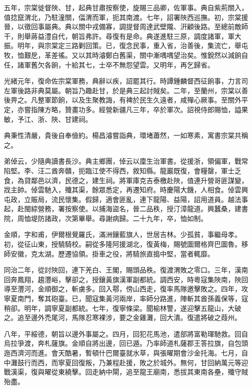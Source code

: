 \begin{pinyinscope}
五年，宗棠徙督陜、甘，起典甘肅按察使，旋賜三品卿，佐軍事。典自紫荊關入，值捻竄渭北，乃駐潼關，偪渭而軍，扼其南渡。七年，詔署陜西巡撫。初，宗棠援晉，以徵回事屬典。典以關中戎備寡，調提督周達武壁隴、汧顧後路。至總前敵師干，則舉蔣益澧自代，朝旨弗許。尋復有是命。典遂進駐三原，調度諸軍，軍大振。明年，與宗棠定三路剿回策。已，復念民事，重入省，治善後，集流亡，舉屯牧，恤艱戹，革差徭。又以其時濬鄭白舊渠，關中漸喁喁望治矣。惟銳然以減餉自任，諸軍舊欠各餉，十給其七，士卒不無怨望雲。又明年，再乞歸省。

光緒元年，復命佐宗棠軍務，典辭以疾，詔罷其行。時譚鍾麟督西征餉事，力言司左軍後路非典莫屬。朝旨乃趣赴甘，於是典三起討賊矣。二年，至蘭州，宗棠以善後畀之。凡整軍節餉，以及生聚教誨，有裨於民生久遠者，咸殫心厥事。至關外平定，亦嘗指陳方略，贊畫功多。經營新疆凡三年，卒於軍次。詔視侍郎賜恤，謚果敏，予江、浙、陜、甘建祠。

典秉性清嚴，貴後自奉儉約。楊昌濬嘗詣典，環堵蕭然，一如寒素，寓書宗棠共稱之。

弟倬云，少隨典讀書長沙。典主鄉團，倬云以廩生治軍書。從援浙，領偏軍，戰常陷堅。李、汪二酋奔贛，扼臨江使不得西，敘知縣。龍巖既復，會糧罄，軍士乏食，為貸鄰邑以濟，民德之，建生祠。將軍庫克吉泰檄赴陜，值連升營哥匪謀變，戕主帥。倬雲馳入，殲其渠，餘眾悉定，再遷知府。時慶陽大饑，人相食。倬雲興屯政，立賑局，流民懷集。假歸，適會匪亂，連下龍陽、益陽，詔用道員。越法事起，赴閩綜營務，署按察使。以捕海盜名，晉二品秩，授汀漳龍道。興蠶桑，建書院，周恤堤防諸政，次第畢舉。尋謝病歸。二十九年，卒，恤如制。

金順，字和甫，伊爾根覺羅氏，滿洲鑲藍旗人，世居吉林。少孤貧，事繼母孝。初，從征山東，授驍騎校。嗣從多隆阿援湖北，復黃梅，賜號圖爾格齊巴圖魯。移師安徽，克太湖。歷遷協領。掛車之役，將騎旅直搗中堅，當者輒靡。

同治二年，從討陜回，連下羌白、王閣，賜頭品秩。復渡渭敗之零口。三年，漢南回奔鳳翔，趨灃峪，擊卻之，授鑲黃旗漢軍副都統。調西安，時粵寇集陜南，陜回導至灃河，金順御之，斬虜多。回入鄠，傍山西走，復率馬隊邀擊敗之。四年，攻寧夏南門，奪其砲臺。已，聞寇集黃河兩岸，率師分路進，陣斬其酋孫義保等，寇稍卻。明年，調寧夏副都統。七年，復寧條梁。聞榆林警，遂迎擊五龍山，大破之。追至邊外禿尾河，馬隊忍寒裸涉，要之金雞灘，回大潰。復遣將破之葭州。

八年，平綏德，朝旨以邊外事屬之。四月，回犯花馬池，遣部將富勒琿馳救。回自烏拉爭渡，奔札薩旗。金順自將出邊，回已遁。乃率師道札薩郡王答拉旗，自包頭迤西濟河而進。會天酷暑，暫頓什巴爾臺就水草，與張曜期會沙金托海。七月，自中灘鼓行而西，而寧夏回復叛，乃兼程赴援，敗之於城外。無何，甘回納萬元等迎戰漢渠，復與曜從東繞擊。回走納中閘，追至龍王廟南，悉拔其東南各壘，殲守賊殆盡。


\end{pinyinscope}
